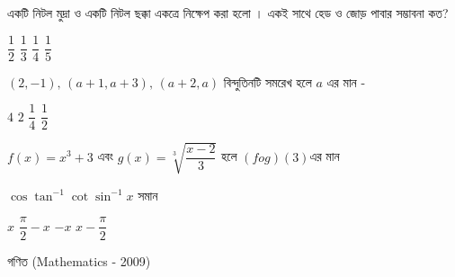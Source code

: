 \documentclass[addpoints]{exam}
\begin{document}
\begin{questions}
\question একটি নিটল মুদ্রা ও একটি নিটল ছক্কা একত্রে  নিক্ষেপ করা হলো । একই সাথে হেড ও জোড় পাবার সম্ভাবনা কত?

\begin{oneparchoices}
\choice $ \dfrac{1}{2} $
\choice $ \dfrac{1}{3} $
\choice $ \dfrac{1}{4} $
\choice $ \dfrac{1}{5} $
\end{oneparchoices}

\question $ (2,-1),\,(a+1,a+3),\,(a+2, a) $  বিন্দুতিনটি সমরেখ হলে $ a $ এর মান -

\begin{oneparchoices}
\choice $ 4 $
\choice $ 2 $
\choice $ \dfrac{1}{4} $
\choice $ \dfrac{1}{2}$

\end{oneparchoices}

\question $ f(x) = x^{3}+3 $ এবং $ g(x) = \sqrt[3]{\dfrac{x-2}{3}} $ হলে $ (fog)(3) $এর মান


\begin{oneparchoices}

\end{oneparchoices}

\question  $ \cos\tan^{-1}\cot\sin^{-1}x $ সমান

\begin{oneparchoices}
\choice $ x $
\choice $ \dfrac{\pi}{2}-x $
\choice $ -x $
\choice $ x-\dfrac{\pi}{2} $
\end{oneparchoices}

\end{questions}
\begin{LARGE}
\begin{center}
গণিত (Mathematics - 2009)
\end{center}
\end{LARGE}
\end{document}
